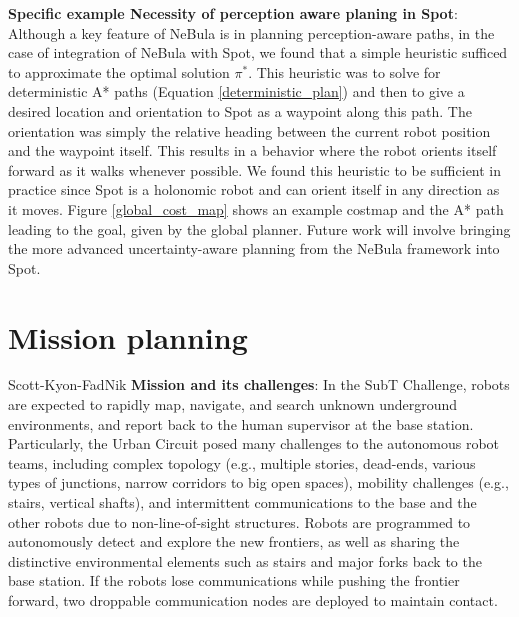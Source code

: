 \documentclass[a4paper, 10pt, conference]{ieeeconf}      %
\newcommand{\ph}[1]{{\textbf{#1}:}} %
\newcommand{\todo}[1]{{\color{red} #1 }} %
\newcommand{\inst}[1]{{\color{orange} #1 }} %
\begin{document}
\ph{Specific example Necessity of perception aware planing in Spot}
Although a key feature of NeBula is in planning perception-aware paths, in the case of integration of NeBula with Spot, we found that a simple heuristic sufficed to approximate the optimal solution $\pi^*$.  This heuristic was to solve for deterministic A* paths (Equation \ref{deterministic_plan}) and then to give a desired location and orientation to Spot as a waypoint along this path.  The orientation was simply the relative heading between the current robot position and the waypoint itself.  This results in a behavior where the robot orients itself forward as it walks whenever possible.  We found this heuristic to be sufficient in practice since Spot is a holonomic robot and can orient itself in any direction as it moves.  Figure \ref{global_cost_map} shows an example costmap and the A* path leading to the goal, given by the global planner.  Future work will involve bringing the more advanced uncertainty-aware planning from the NeBula framework into Spot. 



\section{Mission planning}\label{sec:mission_planning}
\todo{Scott-Kyon-FadNik} \ph{Mission and its challenges} In the SubT Challenge, robots are expected to rapidly map, navigate, and search unknown underground environments, and report back to the human supervisor at the base station. Particularly, the Urban Circuit posed many challenges to the autonomous robot teams, including complex topology (e.g., multiple stories, dead-ends, various types of junctions, narrow corridors to big open spaces), mobility challenges (e.g., stairs, vertical shafts), and intermittent communications to the base and the other robots due to non-line-of-sight structures. Robots are programmed to autonomously detect and explore the new frontiers, as well as sharing the distinctive environmental elements such as stairs and major forks back to the base station. If the robots lose communications while pushing the frontier forward, two droppable communication nodes are deployed to maintain contact.
\end{document}
